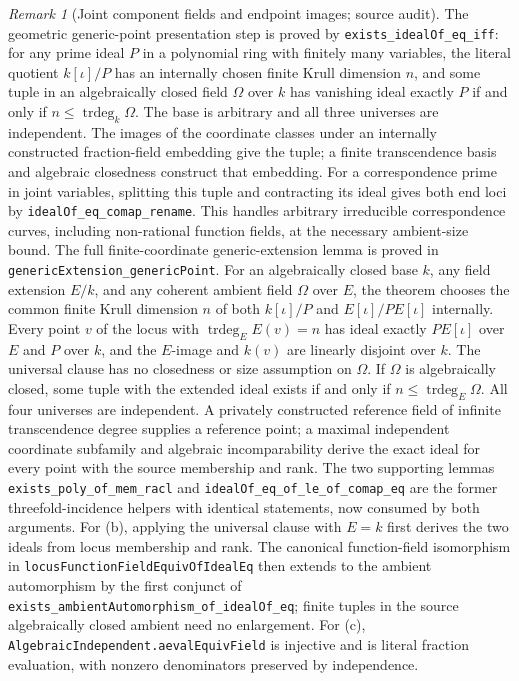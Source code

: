 \documentclass[11pt,oneside]{article}
\theoremstyle{definition}
\theoremstyle{remark}
\newtheorem{remark}[theorem]{Remark}
\newcommand{\trdeg}{\operatorname{trdeg}}
\newcommand{\lean}[1]{\nolinkurl{#1}}
\begin{document}
\begin{remark}[Joint component fields and endpoint images; source audit]
The geometric generic-point presentation step is proved by
\lean{exists_idealOf_eq_iff}: for any prime ideal $P$ in a polynomial ring
with finitely many variables, the literal quotient $k[\iota]/P$ has an
internally chosen finite Krull dimension $n$, and some tuple in an
algebraically closed field $\Omega$ over $k$ has vanishing ideal exactly
$P$ if and only if $n\leq\trdeg_k\Omega$. The base is arbitrary and all
three universes are independent. The images of the coordinate classes
under an internally constructed fraction-field embedding give the tuple;
a finite transcendence basis and algebraic closedness construct that
embedding. For a correspondence prime in joint variables, splitting this
tuple and contracting its ideal gives both end loci by
\lean{idealOf_eq_comap_rename}. This handles arbitrary irreducible
correspondence curves, including non-rational function fields, at the
necessary ambient-size bound.
The full finite-coordinate generic-extension lemma is proved in
\lean{genericExtension_genericPoint}. For an algebraically closed base
$k$, any field extension $E/k$, and any coherent ambient field $\Omega$
over $E$, the theorem chooses the common finite Krull dimension $n$ of
both $k[\iota]/P$ and $E[\iota]/P E[\iota]$ internally. Every point $v$
of the locus with $\trdeg_E E(v)=n$ has ideal exactly $P E[\iota]$ over
$E$ and $P$ over $k$, and the $E$-image and $k(v)$ are linearly disjoint
over $k$. The universal clause has no closedness or size assumption on
$\Omega$. If $\Omega$ is algebraically closed, some tuple with the
extended ideal exists if and only if $n\leq\trdeg_E\Omega$. All four
universes are independent. A privately constructed reference field of
infinite transcendence degree supplies a reference point; a maximal
independent coordinate subfamily and algebraic incomparability derive
the exact ideal for every point with the source membership and rank.
The two supporting lemmas \lean{exists_poly_of_mem_racl} and
\lean{idealOf_eq_of_le_of_comap_eq} are the former threefold-incidence
helpers with identical statements, now consumed by both arguments.
For (b), applying the universal clause with $E=k$ first derives the two
ideals from locus membership and rank. The canonical function-field
isomorphism in \lean{locusFunctionFieldEquivOfIdealEq} then extends to
the ambient automorphism by the first conjunct of
\lean{exists_ambientAutomorphism_of_idealOf_eq}; finite tuples in the
source algebraically closed ambient need no enlargement. For (c),
\lean{AlgebraicIndependent.aevalEquivField} is injective and is literal
fraction evaluation, with nonzero denominators preserved by independence.

\end{remark}
\end{document}
